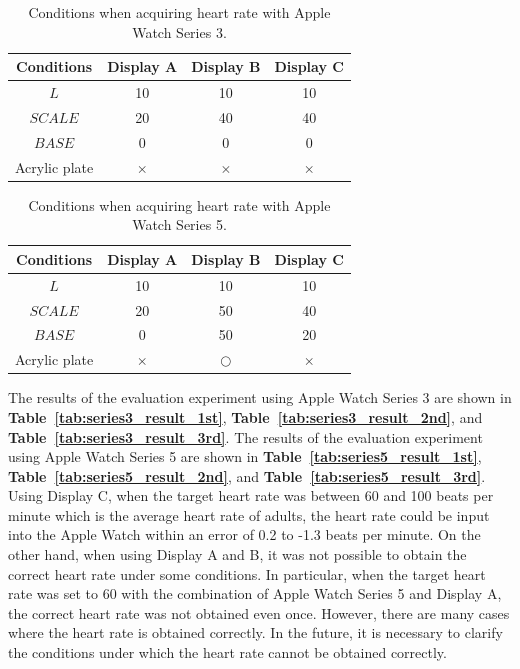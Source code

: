 \documentclass[sigchi,authordraft]{acmart}
\newcommand\tabref[1]{\textbf{Table~\ref{tab:#1}}}
\begin{document}
\begin{table}[!t]
  \centering
  \caption{Conditions when acquiring heart rate with Apple Watch Series 3.}
  \begin{tabular}{c|c|c|c} \hline\hline
    Conditions & Display A & Display B & Display C \\ \hline
    $L$ & 10 & 10 & 10 \\
    $SCALE$ & 20 & 40 & 40 \\
    $BASE$ & 0 & 0 & 0 \\
    Acrylic plate & $\times$ & $\times$ & $\times$ \\ \hline
  \end{tabular}
  \label{tab:series3_params}
\end{table}

\begin{table}[!t]
  \centering
  \caption{Conditions when acquiring heart rate with Apple Watch Series 5.}
  \begin{tabular}{c|c|c|c} \hline\hline
    Conditions & Display A & Display B & Display C \\ \hline
    $L$ & 10 & 10 & 10 \\
    $SCALE$ & 20 & 50 & 40 \\
    $BASE$ & 0 & 50 & 20 \\
    Acrylic plate & $\times$ & $\bigcirc$ & $\times$ \\ \hline
  \end{tabular}
  \label{tab:series5_params}
\end{table}

The results of the evaluation experiment using Apple Watch Series 3 are shown in \tabref{series3_result_1st}, \tabref{series3_result_2nd}, and \tabref{series3_result_3rd}. The results of the evaluation experiment using Apple Watch Series 5 are shown in \tabref{series5_result_1st}, \tabref{series5_result_2nd}, and \tabref{series5_result_3rd}. Using Display C, when the target heart rate was between 60 and 100 beats per minute which is the average heart rate of adults, the heart rate could be input into the Apple Watch within an error of 0.2 to -1.3 beats per minute. On the other hand, when using Display A and B, it was not possible to obtain the correct heart rate under some conditions. In particular, when the target heart rate was set to 60 with the combination of Apple Watch Series 5 and Display A, the correct heart rate was not obtained even once. However, there are many cases where the heart rate is obtained correctly. In the future, it is necessary to clarify the conditions under which the heart rate cannot be obtained correctly.
\end{document}

